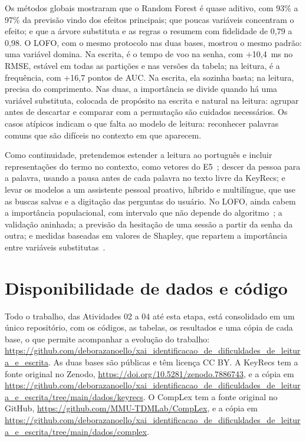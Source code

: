 \documentclass[conference]{IEEEtran}
\newcommand{\RF}{Random Forest}
\begin{document}
Os métodos globais mostraram que o \RF{} é quase aditivo, com 93\% a 97\% da
previsão vindo dos efeitos principais; que poucas variáveis concentram o
efeito; e que a árvore substituta e as regras o resumem com fidelidade de 0,79
a 0,98. O LOFO, com o mesmo protocolo nas duas bases, mostrou o mesmo padrão:
uma variável domina. Na escrita, é o tempo de voo na senha, com +10,4~ms no
RMSE, estável em todas as partições e nas versões da tabela; na leitura, é a
frequência, com +16,7 pontos de AUC. Na escrita, ela sozinha basta; na
leitura, precisa do comprimento. Nas duas, a importância se divide quando há
uma variável substituta, colocada de propósito na escrita e natural na leitura:
agrupar antes de descartar e comparar com a permutação são cuidados
necessários. Os casos atípicos indicam o que falta ao modelo de leitura:
reconhecer palavras comuns que são difíceis no contexto em que aparecem.

Como continuidade, pretendemos estender a leitura ao português e incluir
representações do termo no contexto, como vetores do E5~\cite{wang2024me5};
descer da pessoa para a palavra, usando a pausa antes de cada palavra no texto
livre da KeyRecs; e levar os modelos a um assistente pessoal proativo, híbrido
e multilíngue, que use as buscas salvas e a digitação das perguntas do
usuário. No LOFO, ainda cabem a importância populacional, com intervalo que não
depende do algoritmo~\cite{williamson2023general}; a validação aninhada; a
previsão da hesitação de uma sessão a partir da senha da outra; e medidas
baseadas em valores de Shapley, que repartem a importância entre variáveis
substitutas~\cite{covert2021explaining}.

\section*{Disponibilidade de dados e código}

Todo o trabalho, das Atividades 02 a 04 até esta etapa, está consolidado em um
único repositório, com os códigos, as tabelas, os resultados e uma cópia de cada
base, o que permite acompanhar a evolução do trabalho:
\url{https://github.com/deborazanoello/xai_identificacao_de_dificuldades_de_leitura_e_escrita}.
As duas bases são públicas e têm licença CC BY. A KeyRecs tem a fonte original
no Zenodo, \url{https://doi.org/10.5281/zenodo.7886743}, e a cópia em
\url{https://github.com/deborazanoello/xai_identificacao_de_dificuldades_de_leitura_e_escrita/tree/main/dados/keyrecs}.
O CompLex tem a fonte original no GitHub,
\url{https://github.com/MMU-TDMLab/CompLex}, e a cópia em
\url{https://github.com/deborazanoello/xai_identificacao_de_dificuldades_de_leitura_e_escrita/tree/main/dados/complex}.

\balance


\end{document}
